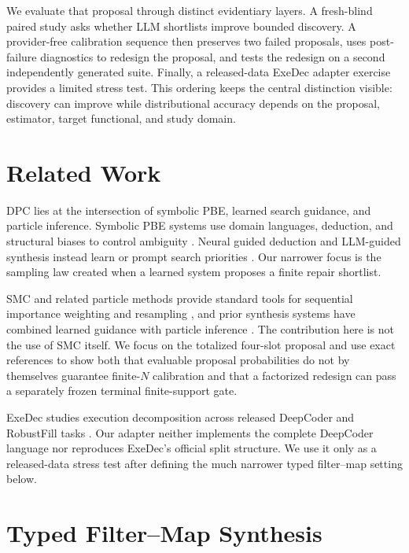 \documentclass[twoside,11pt]{article}
\newcommand{\method}{\textsc{DPC}\xspace}
\begin{document}
We evaluate that proposal through distinct evidentiary layers. A fresh-blind
paired study asks whether LLM shortlists improve bounded discovery. A
provider-free calibration sequence then preserves two failed proposals, uses
post-failure diagnostics to redesign the proposal, and tests the redesign on a
second independently generated suite. Finally, a released-data ExeDec adapter
exercise provides a limited stress test. This ordering keeps the central
distinction visible: discovery can improve while distributional accuracy
depends on the proposal, estimator, target functional, and study domain.

\section{Related Work}
\label{sec:related}

\method lies at the intersection of symbolic PBE, learned search guidance, and
particle inference. Symbolic PBE systems use domain languages, deduction, and
structural biases to control ambiguity
\citep{gulwani2011flashfill,feser2015datastructure}. Neural guided deduction and
LLM-guided synthesis instead learn or prompt search priorities
\citep{kalyan2018ngds,barke2024hysynth,li2024enumerative}. Our narrower focus is
the sampling law created when a learned system proposes a finite repair
shortlist.

SMC and related particle methods provide standard tools for sequential
importance weighting and resampling
\citep{delmoral2004feynman,delmoral2006smc,naesseth2019smc}, and prior synthesis
systems have combined learned guidance with particle inference
\citep{ellis2019repl,wahl2026modelsmc}. The contribution here is not the use of
SMC itself. We focus on the totalized four-slot proposal and use exact
references to show both that evaluable proposal probabilities do not by
themselves guarantee finite-$N$ calibration and that a factorized redesign can
pass a separately frozen terminal finite-support gate.

ExeDec studies execution decomposition across released DeepCoder and RobustFill
tasks \citep{shi2024exedec}. Our adapter neither implements the complete
DeepCoder language nor reproduces ExeDec's official split structure. We use it
only as a released-data stress test after defining the much narrower typed
filter--map setting below.

\section{Typed Filter--Map Synthesis}
\label{sec:setting}
\end{document}
